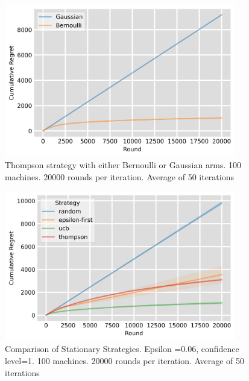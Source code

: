 \begin{figure}
  \centering
    \includegraphics[width=0.9\textwidth]{figures/thompson_plot.png}
    \caption[Thompson strategy with either Bernoulli or Gaussian arms]{Thompson strategy with either Bernoulli or Gaussian arms. 100 machines. 20000 rounds per iteration. Average of 50 iterations}
    \label{fig: thompson}
\end{figure}

\begin{figure}
  \centering
    \includegraphics[width=0.9\textwidth]{figures/plot.png}
    \caption[Comparison of Stationary Strategies]{Comparison of Stationary Strategies. Epsilon =0.06, confidence level=1. 100 machines. 20000 rounds per iteration. Average of 50 iterations}
    \label{fig: all1}
\end{figure}

